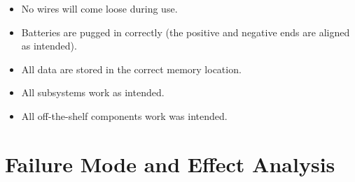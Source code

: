 \documentclass{article}
\begin{document}
\begin{itemize}
\item No wires will come loose during use.
\item Batteries are pugged in correctly (the positive and negative ends are aligned as intended).
\item All data are stored in the correct memory location.
\item All subsystems work as intended.
\item All off-the-shelf components work was intended.
\end{itemize}

\section{Failure Mode and Effect Analysis}
\end{document}
